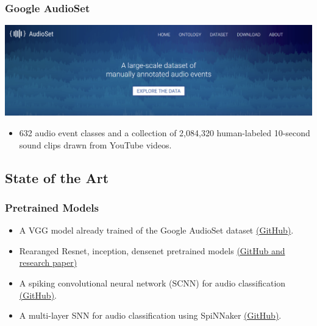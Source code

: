 \documentclass[aspectratio=169, 11pt]{beamer}
\begin{document}
\begin{frame}
  \frametitle{Google AudioSet}


  \begin{center}
    \includegraphics[width=\textwidth]{image/audioset.png}
  \end{center}

  \begin{itemize}
    \item 632 audio event classes and a collection of 2,084,320 human-labeled 10-second sound clips drawn from YouTube videos.
  \end{itemize}

\end{frame}

\subsection{State of the Art}
\begin{frame}
  \frametitle{Pretrained Models}
  \begin{itemize}
    \item  A VGG model already trained of the Google AudioSet dataset \href{https://research.google/pubs/pub45611/}{(GitHub)}.
    \item Rearanged Resnet, inception, densenet pretrained models \href{https://arxiv.org/abs/2007.11154}{(GitHub and research paper)}
    \item A spiking convolutional neural network (SCNN) for audio classification \href{https://github.com/CongSheng/SpikingConvNN-AudioClassification/tree/main}{(GitHub)}.
    \item A multi-layer SNN for audio classification using SpiNNaker \href{https://github.com/jpdominguez/Multilayer-SNN-for-audio-samples-classification-using-SpiNNaker}{(GitHub)}.
  \end{itemize}

\end{frame}
\end{document}
